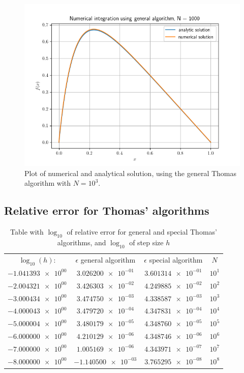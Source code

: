 \documentclass[english,notitlepage,reprint]{revtex4-1}  %
\begin{document}
\begin{figure}[H]
	\centering
	\label{fig:iv:a:3}
	\includegraphics[width=\columnwidth]{plots/Figure_3.png}
	\caption{Plot of numerical and analytical solution, using the general Thomas algorithm with
	\(N=10^{3}\).}
\end{figure}

\subsection{Relative error for Thomas' algorithms} \label{subsec:IV:B}
\begin{table}[H]
	\label{table:iv:a:1}
	\begin{tabular}{|c|c|c|c|}
		\(\log_{10}(h)\): & \(\epsilon\) general algorithm & \(\epsilon\) special algorithm & \(N\) \\
		\(\num{-1.041393e+00}\) & \(\num{3.026200e-01}\) & \(\num{3.601314e-01}\) & \(10^{1}\) \\
		\(\num{-2.004321e+00}\) & \(\num{3.426303e-02}\) & \(\num{4.249885e-02}\) & \(10^{2}\) \\
		\(\num{-3.000434e+00}\) & \(\num{3.474750e-03}\) & \(\num{4.338587e-03}\) & \(10^{3}\) \\
		\(\num{-4.000043e+00}\) & \(\num{3.479720e-04}\) & \(\num{4.347831e-04}\) & \(10^{4}\) \\
		\(\num{-5.000004e+00}\) & \(\num{3.480179e-05}\) & \(\num{4.348760e-05}\) & \(10^{5}\) \\
		\(\num{-6.000000e+00}\) & \(\num{4.210129e-06}\) & \(\num{4.348746e-06}\) & \(10^{6}\) \\
		\(\num{-7.000000e+00}\) & \(\num{1.005169e-06}\) & \(\num{4.343971e-07}\) & \(10^{7}\) \\
		\(\num{-8.000000e+00}\) & \(\num{-1.140500e-03}\) & \(\num{3.765295e-08}\) & \(10^{8}\)
	\end{tabular}
	\caption{Table with \(\log_{10}\) of relative error for general and special Thomas' algorithms, and \(\log_{10}\) of step size \(h\)}
\end{table}
\end{document}
